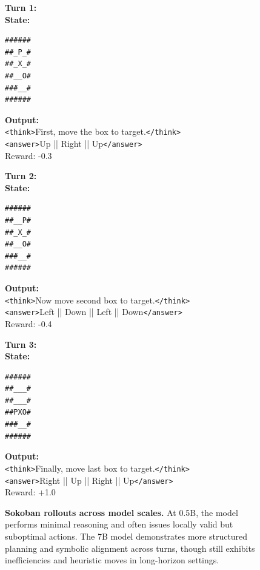 \begin{figure}[t]
\begin{tcolorbox}[colback=gray!2, colframe=black, boxrule=0.5pt, arc=2pt, width=0.95\linewidth, title=7B Sokoban – Multi-Turn Rollout]
\textbf{Turn 1:} \\
\textbf{State:}
\begin{verbatim}
######
##_P_#
##_X_#
##__O#
###__#
######
\end{verbatim}
\textbf{Output:} \\
\texttt{<think>}First, move the box to target.\texttt{</think>} \\
\texttt{<answer>}Up || Right || Up\texttt{</answer>} \\
Reward: -0.3

\vspace{4pt}
\textbf{Turn 2:} \\
\textbf{State:}
\begin{verbatim}
######
##__P#
##_X_#
##__O#
###__#
######
\end{verbatim}
\textbf{Output:} \\
\texttt{<think>}Now move second box to target.\texttt{</think>} \\
\texttt{<answer>}Left || Down || Left || Down\texttt{</answer>} \\
Reward: -0.4

\vspace{4pt}
\textbf{Turn 3:} \\
\textbf{State:}
\begin{verbatim}
######
##___#
##___#
##PXO#
###__#
######
\end{verbatim}
\textbf{Output:} \\
\texttt{<think>}Finally, move last box to target.\texttt{</think>} \\
\texttt{<answer>}Right || Up || Right || Up\texttt{</answer>} \\
Reward: +1.0
\end{tcolorbox}
\caption{\textbf{Sokoban rollouts across model scales.} At 0.5B, the model performs minimal reasoning and often issues locally valid but suboptimal actions. The 7B model demonstrates more structured planning and symbolic alignment across turns, though still exhibits inefficiencies and heuristic moves in long-horizon settings.}
\label{fig:sokoban-multiscale}
\vspace{-10pt}
\end{figure}


